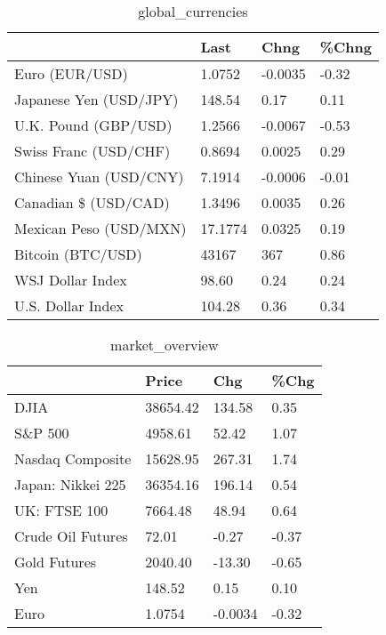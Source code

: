 \documentclass{article}%
\begin{document}
%


\begin{table}[htbp]%
\caption{global\_currencies}%
\centering%
\begin{adjustbox}{width=1\textwidth}%
\begin{tabular}{llll}
\toprule
                       &    Last &    Chng & \%Chng \\
\midrule
        Euro (EUR/USD) &  1.0752 & -0.0035 & -0.32 \\
Japanese Yen (USD/JPY) &  148.54 &    0.17 &  0.11 \\
  U.K. Pound (GBP/USD) &  1.2566 & -0.0067 & -0.53 \\
 Swiss Franc (USD/CHF) &  0.8694 &  0.0025 &  0.29 \\
Chinese Yuan (USD/CNY) &  7.1914 & -0.0006 & -0.01 \\
  Canadian \$ (USD/CAD) &  1.3496 &  0.0035 &  0.26 \\
Mexican Peso (USD/MXN) & 17.1774 &  0.0325 &  0.19 \\
     Bitcoin (BTC/USD) &   43167 &     367 &  0.86 \\
      WSJ Dollar Index &   98.60 &    0.24 &  0.24 \\
     U.S. Dollar Index &  104.28 &    0.36 &  0.34 \\
\bottomrule
\end{tabular}
%
\end{adjustbox}%
\end{table}

%


\begin{table}[htbp]%
\caption{market\_overview}%
\centering%
\begin{adjustbox}{width=1\textwidth}%
\begin{tabular}{llll}
\toprule
                  &    Price &     Chg &  \%Chg \\
\midrule
             DJIA & 38654.42 &  134.58 &  0.35 \\
          S\&P 500 &  4958.61 &   52.42 &  1.07 \\
 Nasdaq Composite & 15628.95 &  267.31 &  1.74 \\
Japan: Nikkei 225 & 36354.16 &  196.14 &  0.54 \\
     UK: FTSE 100 &  7664.48 &   48.94 &  0.64 \\
Crude Oil Futures &    72.01 &   -0.27 & -0.37 \\
     Gold Futures &  2040.40 &  -13.30 & -0.65 \\
              Yen &   148.52 &    0.15 &  0.10 \\
             Euro &   1.0754 & -0.0034 & -0.32 \\
\bottomrule
\end{tabular}
%
\end{adjustbox}%
\end{table}

%
\end{document}
